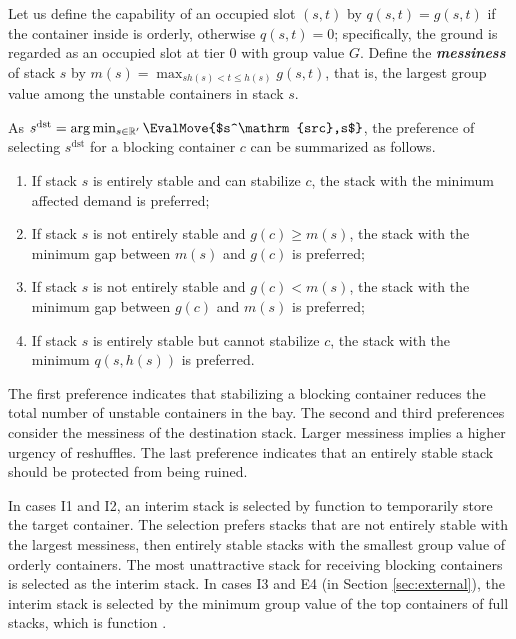 \documentclass[review,3p,times,12pt,number]{elsarticle}\usepackage{amsmath}\usepackage{amssymb}
\renewcommand{\emph}[1]{\textbf{\textit{#1}}}
\newcommand{\mss}{s^\mathrm{src}}
\newcommand{\mds}{s^\mathrm{dst}}
\begin{document}
Let us define the capability of an occupied slot $(s,t)$ by $q(s,t) = g(s, t)$ if the container inside is orderly, otherwise $q(s, t) = 0$; specifically, the ground is regarded as an occupied slot at tier 0 with group value $G$.
Define the \emph{messiness} of stack $s$ by $m(s)=\max_{\mathit{sh}(s)<t\le h(s)}g(s,t)$, that is, the largest group value among the unstable containers in stack $s$.

As $\mds=\arg\min_{s\in\mathbb{R}'} \EvalMove{$\mss,s$}$, the preference of selecting $\mds$ for a blocking container $c$ can be summarized as follows.
\begin{enumerate}
\item If stack $s$ is entirely stable and can stabilize $c$, the stack with the minimum affected demand is preferred;
\item If stack $s$ is not entirely stable and $g(c)\ge m(s)$, the stack with the minimum gap between $m(s)$ and $g(c)$ is preferred;
\item If stack $s$ is not entirely stable and $g(c)< m(s)$, the stack with the minimum gap between $g(c)$ and $m(s)$ is preferred;
\item If stack $s$ is entirely stable but cannot stabilize $c$, the stack with the minimum $q(s,h(s))$ is preferred.
\end{enumerate}

The first preference indicates that stabilizing a blocking container reduces the total number of unstable containers in the bay. The second and third preferences consider the messiness of the destination stack.
Larger messiness implies a higher urgency of reshuffles. The last preference indicates that an entirely stable stack should be protected from being ruined.

In cases I1 and I2, an interim stack is selected by function  to temporarily store the target container.
The selection prefers stacks that are not entirely stable with the largest messiness, then entirely stable stacks with the smallest group value of orderly containers.
The most unattractive stack for receiving blocking containers is selected as the interim stack. In cases I3 and E4 (in Section \ref{sec:external}), the interim stack is selected by the minimum group value of the top containers of full stacks, which is function .
\end{document}
